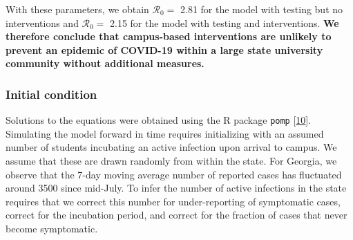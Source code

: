 \documentclass[
]{article}
\begin{document}
With these parameters, we obtain \(\mathcal{R}_{0}=\) 2.81 for the model
with testing but no interventions and \(\mathcal{R}_{0}=\) 2.15 for the
model with testing and interventions. \textbf{We therefore conclude that
campus-based interventions are unlikely to prevent an epidemic of
COVID-19 within a large state university community without additional
measures.}

\hypertarget{initial-condition}{%
\subsubsection{Initial condition}\label{initial-condition}}

Solutions to the equations were obtained using the R package
\texttt{pomp} {[}\protect\hyperlink{ref-King2016-ra}{10}{]}. Simulating
the model forward in time requires initializing with an assumed number
of students incubating an active infection upon arrival to campus. We
assume that these are drawn randomly from within the state. For Georgia,
we observe that the 7-day moving average number of reported cases has
fluctuated around 3500 since mid-July. To infer the number of active
infections in the state requires that we correct this number for
under-reporting of symptomatic cases, correct for the incubation period,
and correct for the fraction of cases that never become symptomatic.
\end{document}
